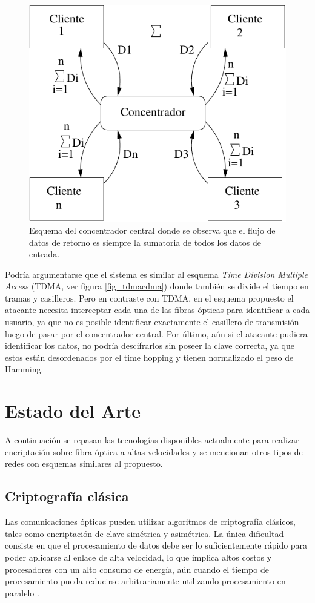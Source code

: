 \begin{figure}[t]
  \centering
  \includegraphics[width=0.5 \textwidth]{graphs/concentrador} 
  \caption{Esquema del concentrador central donde se observa que el flujo de datos de retorno es siempre la sumatoria de todos los datos de entrada.}
  \label{fig_use}
\end{figure}

Podría argumentarse que el sistema es similar al esquema \textit{Time Division Multiple Access} (TDMA, ver figura \ref{fig_tdmacdma}) donde también se divide el tiempo en tramas y casilleros. Pero en contraste con TDMA, en el esquema propuesto el atacante necesita interceptar cada una de las fibras ópticas para identificar a cada usuario, ya que no es posible identificar exactamente el casillero de transmisión luego de pasar por el concentrador central. Por último, aún si el atacante pudiera identificar los datos, no podría descifrarlos sin poseer la clave correcta, ya que estos están desordenados por el time hopping y tienen normalizado el peso de Hamming.


\section{Estado del Arte}

A continuación se repasan las tecnologías disponibles actualmente para realizar encriptación sobre fibra óptica a altas velocidades y se mencionan otros tipos de redes con esquemas similares al propuesto.

\subsection{Criptografía clásica}
Las comunicaciones ópticas pueden utilizar algoritmos de criptografía clásicos, tales como encriptación de clave simétrica y asimétrica. La única dificultad consiste en que el procesamiento de datos debe ser lo suficientemente rápido para poder aplicarse al enlace de alta velocidad, lo que implica altos costos y procesadores con un alto consumo de energía, aún cuando el tiempo de procesamiento pueda reducirse arbitrariamente utilizando procesamiento en paralelo \cite{liforward}.

